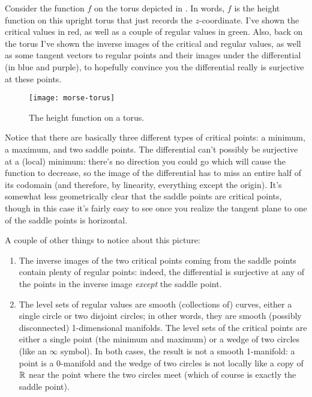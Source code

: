 \begin{example}
	Consider the function $f$ on the torus depicted in . In words, $f$ is the height function on this upright torus that just records the $z$-coordinate. I've shown the critical values in red, as well as a couple of regular values in green. Also, back on the torus I've shown the inverse images of the critical and regular values, as well as some tangent vectors to regular points and their images under the differential (in blue and purple), to hopefully convince you the differential really is surjective at these points.
	
	\begin{figure}[htbp]
		\centering
			\texttt{[image: morse-torus]}
		\caption{The height function on a torus.}
		\label{fig:morse-torus}
	\end{figure}
	
	Notice that there are basically three different types of critical points: a minimum, a maximum, and two saddle points. The differential can't possibly be surjective at a (local) minimum: there's no direction you could go which will cause the function to decrease, so the image of the differential has to miss an entire half of its codomain (and therefore, by linearity, everything except the origin). It's somewhat less geometrically clear that the saddle points are critical points, though in this case it's fairly easy to see once you realize the tangent plane to one of the saddle points is horizontal.
	
	A couple of other things to notice about this picture:
	\begin{enumerate}
		\item The inverse images of the two critical points coming from the saddle points contain plenty of regular points: indeed, the differential is surjective at any of the points in the inverse image \emph{except} the saddle point.
		
		\item The level sets of regular values are smooth (collections of) curves, either a single circle or two disjoint circles; in other words, they are smooth (possibly disconnected) 1-dimensional manifolds. The level sets of the critical points are either a single point (the minimum and maximum) or a wedge of two circles (like an $\infty$ symbol). In both cases, the result is not a smooth 1-manifold: a point is a 0-manifold and the wedge of two circles is not locally like a copy of $\mathbb{R}$ near the point where the two circles meet (which of course is exactly the saddle point).
	\end{enumerate}
\end{example}

